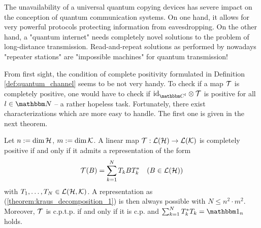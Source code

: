 \begin{remark}
	The unavailability of a universal quantum copying devices has severe impact on the conception of quantum communication systems. On one hand, it allows for very powerful protocols protecting information from eavesdropping. On the other hand, a "quantum internet" needs completely novel solutions to the problem of long-distance transmission. Read-and-repeat solutions as performed by nowadays "repeater stations" are "impossible machines" for quantum transmission!
\end{remark}
From first sight, the condition of complete positivity formulated in Definition \ref{def:quantum_channel} seems to be not very handy. To check if a map ${\mathcal T}$ is completely positive, one would have to check if $\id_{\bbmC^l} \otimes \cT$ is positive for all $l \in \bbmN$ -- a rather hopeless task. Fortunately, there exist characterizations which are more easy to handle. The first one is given in the next theorem. 
\begin{theorem} \label{theorem:kraus_decomposition}  
Let $n := \dim {\mathcal H}$, $m := \dim {\mathcal K}$. A linear map ${\mathcal T}: {\mathcal L}({\mathcal H}) \rightarrow {\mathcal L}({\mathcal K})$ 
is completely positive if and only if it admits a representation of the form
 \begin{align}
  {\mathcal T}(B) = \sum_{k=1}^N T_k B T_k^\ast &&(B \in {\mathcal L}({\mathcal H})) \label{theorem:kraus_decomposition_1}
 \end{align}
 with $T_1,\dots,T_N \in {\mathcal L}({\mathcal H}, {\mathcal K})$. A representation as (\ref{theorem:kraus_decomposition_1}) is then always possible with $N \leq n^2 \cdot m^2$.  Moreover, ${\mathcal T}$ is c.p.t.p. if and only if it is c.p. and 
 $
  \sum_{k =1}^N T_k^\ast T_k = \bbmeins_n
 $
 holds. 
\end{theorem}
